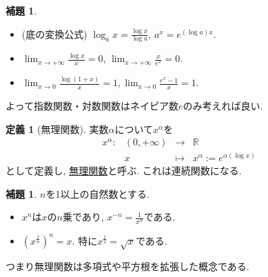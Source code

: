 \documentclass[dvipdfmx,a4paper,11pt]{article}
\newcommand{\R}{\mathbb{R}}
\theoremstyle{definition}
\newtheorem{lem}[thm]{補題}
\newtheorem{dfn}[thm]{定義}
\begin{document}
   \begin{tcolorbox}[
    colback = white,
    colframe = green!35!black,
    fonttitle = \bfseries,
    breakable = true]
    \begin{lem}
    \text{}
    \begin{itemize}
      \setlength{\parskip}{0cm} 
  \setlength{\itemsep}{0cm}
  \item (底の変換公式) $\log_{a}x = \frac{\log x}{\log a}$,  $a^{x} = e^{(\log a)x}$.
  \item $\lim_{x \to +\infty}\frac{\log x}{x}=0$, $\lim_{x \to +\infty}\frac{x}{e^x}=0$.
\item $\lim_{x \to 0}\frac{\log(1+x)}{x} = 1, \lim_{x \to 0}\frac{e^x - 1}{x} =1$.
\end{itemize}
 \end{lem}
   \end{tcolorbox}
   
      よって指数関数・対数関数はネイピア数$e$のみ考えれば良い. 
      
   
 
 \begin{tcolorbox}[
    colback = white,
    colframe = green!35!black,
    fonttitle = \bfseries,
    breakable = true]
    \begin{dfn}[無理関数]
実数$\alpha$について$x^{\alpha}$を
$$
\begin{array}{cccc}
x^{\alpha}: &(0, + \infty) & \rightarrow & \R \\
&x& \longmapsto & x^{\alpha}:= e^{\alpha (\log x)}
\end{array}
$$
として定義し, \underline{無理関数}と呼ぶ. 
これは連続関数になる. 
  \end{dfn}
   \end{tcolorbox}
   
\begin{tcolorbox}[
    colback = white,
    colframe = green!35!black,
    fonttitle = \bfseries,
    breakable = true]
    \begin{lem}
$n$を1以上の自然数とする.
            \begin{itemize}
      \setlength{\parskip}{0cm} 
  \setlength{\itemsep}{0cm}
  \item  $x^{n}$は$x$の$n$乗であり, $x^{-n} = \frac{1}{x^n}$である. 
  \item $(x^{\frac{1}{n}})^n=x$. 特に$x^{\frac{1}{2}}=\sqrt{x}$である. 
\end{itemize}
 \end{lem}
   \end{tcolorbox}
つまり無理関数は多項式や平方根を拡張した概念である.  
\end{document}
